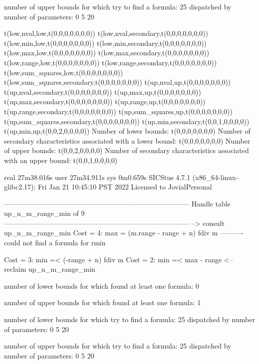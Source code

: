 number of upper bounds for which try to find a formula: 25
dispatched by number of parameters: 0  5  20

t(low,nval,low,t(0,0,0,0,0,0,0))
t(low,nval,secondary,t(0,0,0,0,0,0,0))
t(low,min,low,t(0,0,0,0,0,0,0))
t(low,min,secondary,t(0,0,0,0,0,0,0))
t(low,max,low,t(0,0,0,0,0,0,0))
t(low,max,secondary,t(0,0,0,0,0,0,0))
t(low,range,low,t(0,0,0,0,0,0,0))
t(low,range,secondary,t(0,0,0,0,0,0,0))
t(low,sum_squares,low,t(0,0,0,0,0,0,0))
t(low,sum_squares,secondary,t(0,0,0,0,0,0,0))
t(up,nval,up,t(0,0,0,0,0,0,0))
t(up,nval,secondary,t(0,0,0,0,0,0,0))
t(up,max,up,t(0,0,0,0,0,0,0))
t(up,max,secondary,t(0,0,0,0,0,0,0))
t(up,range,up,t(0,0,0,0,0,0,0))
t(up,range,secondary,t(0,0,0,0,0,0,0))
t(up,sum_squares,up,t(0,0,0,0,0,0,0))
t(up,sum_squares,secondary,t(0,0,0,0,0,0,0))
t(up,min,secondary,t(0,0,1,0,0,0,0))
t(up,min,up,t(0,0,2,0,0,0,0))
Number of lower bounds:                                             t(0,0,0,0,0,0,0)
Number of secondary characteristics associated with a lower bound:  t(0,0,0,0,0,0,0)
Number of upper bounds:                                             t(0,0,2,0,0,0,0)
Number of secondary characteristics associated with an upper bound: t(0,0,1,0,0,0,0)

real	27m38.016s
user	27m34.911s
sys	0m0.659s
SICStus 4.7.1 (x86_64-linux-glibc2.17): Fri Jan 21 10:45:10 PST 2022
Licensed to JovialPersonal


--------------------------------------------------------------------------------
Handle table up_n_m_range_min of 9
--------------------------------------------------------------------------------
--> consult up_n_m_range_min
Cost =  4:  max  = (m.range - range + n) fdiv m
----------
could not find a formula for rmin

Cost =  3:  min =< (-range + n) fdiv m
Cost =  2:  min =< max - range
<-- reclaim up_n_m_range_min

number of lower bounds for which found at least one formula: 0

number of upper bounds for which found at least one formula: 1

number of lower bounds for which try to find a formula: 25
dispatched by number of parameters: 0  5  20

number of upper bounds for which try to find a formula: 25
dispatched by number of parameters: 0  5  20

